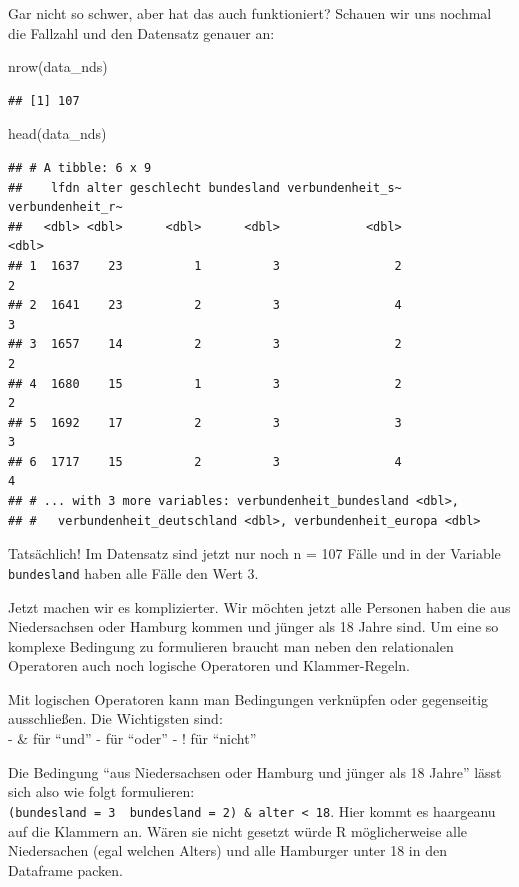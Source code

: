 \documentclass[
]{book}
\newenvironment{Shaded}{\begin{snugshade}}{\end{snugshade}}
\newcommand{\FunctionTok}[1]{\textcolor[rgb]{0.00,0.00,0.00}{#1}}
\newcommand{\NormalTok}[1]{#1}
\begin{document}
Gar nicht so schwer, aber hat das auch funktioniert? Schauen wir uns nochmal die Fallzahl und den Datensatz genauer an:

\begin{Shaded}
\begin{Highlighting}[]
\FunctionTok{nrow}\NormalTok{(data\_nds)}
\end{Highlighting}
\end{Shaded}

\begin{verbatim}
## [1] 107
\end{verbatim}

\begin{Shaded}
\begin{Highlighting}[]
\FunctionTok{head}\NormalTok{(data\_nds)}
\end{Highlighting}
\end{Shaded}

\begin{verbatim}
## # A tibble: 6 x 9
##    lfdn alter geschlecht bundesland verbundenheit_s~ verbundenheit_r~
##   <dbl> <dbl>      <dbl>      <dbl>            <dbl>            <dbl>
## 1  1637    23          1          3                2                2
## 2  1641    23          2          3                4                3
## 3  1657    14          2          3                2                2
## 4  1680    15          1          3                2                2
## 5  1692    17          2          3                3                3
## 6  1717    15          2          3                4                4
## # ... with 3 more variables: verbundenheit_bundesland <dbl>,
## #   verbundenheit_deutschland <dbl>, verbundenheit_europa <dbl>
\end{verbatim}

Tatsächlich! Im Datensatz sind jetzt nur noch n = 107 Fälle und in der Variable \texttt{bundesland} haben alle Fälle den Wert 3.

Jetzt machen wir es komplizierter. Wir möchten jetzt alle Personen haben die aus Niedersachsen oder Hamburg kommen und jünger als 18 Jahre sind. Um eine so komplexe Bedingung zu formulieren braucht man neben den relationalen Operatoren auch noch logische Operatoren und Klammer-Regeln.

Mit logischen Operatoren kann man Bedingungen verknüpfen oder gegenseitig ausschließen. Die Wichtigsten sind:\\
- \& für ``und''
- \textbar{} für ``oder''
- ! für ``nicht''

Die Bedingung ``aus Niedersachsen oder Hamburg und jünger als 18 Jahre'' lässt sich also wie folgt formulieren: \texttt{(bundesland\ =\ 3\ \textbar{}\ bundesland\ =\ 2)\ \&\ alter\ \textless{}\ 18}. Hier kommt es haargeanu auf die Klammern an. Wären sie nicht gesetzt würde R möglicherweise alle Niedersachen (egal welchen Alters) und alle Hamburger unter 18 in den Dataframe packen.
\end{document}
